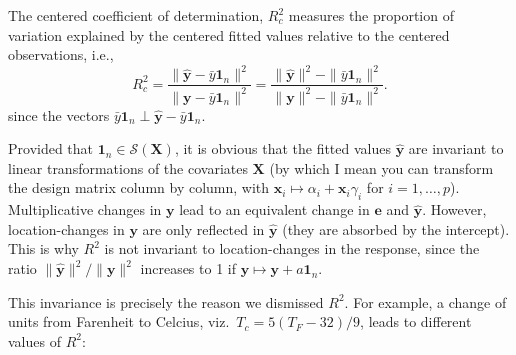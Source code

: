 \documentclass[]{book}
\newenvironment{Shaded}{\begin{snugshade}}{\end{snugshade}}
\newcommand{\CommentTok}[1]{\textcolor[rgb]{0.56,0.35,0.01}{\textit{#1}}}
\newcommand{\DataTypeTok}[1]{\textcolor[rgb]{0.13,0.29,0.53}{#1}}
\newcommand{\DecValTok}[1]{\textcolor[rgb]{0.00,0.00,0.81}{#1}}
\newcommand{\KeywordTok}[1]{\textcolor[rgb]{0.13,0.29,0.53}{\textbf{#1}}}
\newcommand{\NormalTok}[1]{#1}
\newcommand{\OperatorTok}[1]{\textcolor[rgb]{0.81,0.36,0.00}{\textbf{#1}}}
\newcommand{\StringTok}[1]{\textcolor[rgb]{0.31,0.60,0.02}{#1}}
\theoremstyle{definition}
\theoremstyle{definition}
\theoremstyle{definition}
\theoremstyle{remark}
\begin{document}
The centered coefficient of determination, \(R^2_c\) measures the
proportion of variation explained by the centered fitted values relative
to the centered observations, i.e.,
\[ R^2_c = \frac{\|\hat{\boldsymbol{y}}-\bar{y}\mathbf{1}_n\|^2}{\|\boldsymbol{y}-\bar{y}\mathbf{1}_n\|^2}=\frac{\|\hat{\boldsymbol{y}}\|^2-\|\bar{y}\mathbf{1}_n\|^2}{\|\boldsymbol{y}\|^2-\|\bar{y}\mathbf{1}_n\|^2}.\]
since the vectors
\(\bar{y}\mathbf{1}_n \perp \hat{\boldsymbol{y}}-\bar{y}\mathbf{1}_n\).

Provided that \(\mathbf{1}_n \in \mathscr{S}(\mathbf{X})\), it is
obvious that the fitted values \(\hat{\boldsymbol{y}}\) are invariant to
linear transformations of the covariates \(\mathbf{X}\) (by which I mean
you can transform the design matrix column by column, with
\(\mathbf{x}_i \mapsto \alpha_i+\mathbf{x}_i\gamma_i\) for
\(i=1, \ldots, p\)). Multiplicative changes in \(\boldsymbol{y}\) lead
to an equivalent change in \(\boldsymbol{e}\) and
\(\hat{\boldsymbol{y}}\). However, location-changes in
\(\boldsymbol{y}\) are only reflected in \(\hat{\boldsymbol{y}}\) (they
are absorbed by the intercept). This is why \(R^2\) is not invariant to
location-changes in the response, since the ratio
\(\|\hat{\boldsymbol{y}}\|^2/\|\boldsymbol{y}\|^2\) increases to 1 if
\({\boldsymbol{y}}\mapsto {\boldsymbol{y}}+ a \mathbf{1}_n\).

This invariance is precisely the reason we dismissed \(R^2\). For
example, a change of units from Farenheit to Celcius,
viz.~\(T_c = 5 (T_F - 32)/9\), leads to different values of \(R^2\):

\begin{Shaded}
\end{Shaded}
\end{document}
